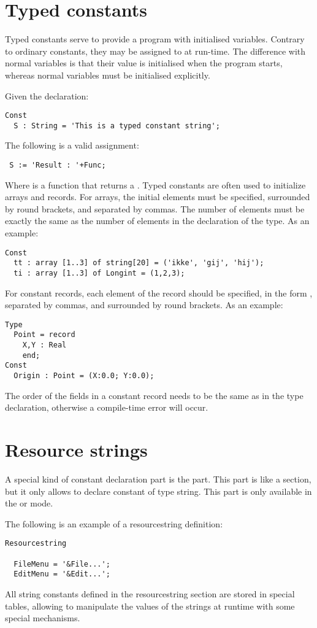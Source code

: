 \section{Typed constants}
Typed constants serve to provide a program with initialised variables.
Contrary to ordinary constants, they may be assigned to at run-time.
The difference with normal variables is that their value is initialised
when the program starts, whereas normal variables must be initialised
explicitly.

Given the declaration:
\begin{verbatim}
Const
  S : String = 'This is a typed constant string';
\end{verbatim}
The following is a valid assignment:
\begin{verbatim}
 S := 'Result : '+Func;
\end{verbatim}
Where  is a function that returns a .
Typed constants are often used to initialize arrays and records. For arrays,
the initial elements must be specified, surrounded by round brackets, and
separated by commas. The number of elements must be exactly the same as
the number of elements in the declaration of the type.
As an example:
\begin{verbatim}
Const
  tt : array [1..3] of string[20] = ('ikke', 'gij', 'hij');
  ti : array [1..3] of Longint = (1,2,3);
\end{verbatim}
For constant records, each element of the record should be specified, in
the form , separated by commas, and surrounded by round
brackets.
As an example:
\begin{verbatim}
Type
  Point = record
    X,Y : Real
    end;
Const
  Origin : Point = (X:0.0; Y:0.0);
\end{verbatim}
The order of the fields in a constant record needs to be the same as in the type declaration,
otherwise a compile-time error will occur.
\section{Resource strings}
\label{se:resourcestring}
A special kind of constant declaration part is the 
part. This part is like a  section, but it only allows
to declare constant of type string. This part is only available in the
 or  mode.

The following is an example of a resourcestring definition:
\begin{verbatim}
Resourcestring

  FileMenu = '&File...';
  EditMenu = '&Edit...';
\end{verbatim}
All string constants defined in the resourcestring section are stored
in special tables, allowing to manipulate the values of the strings
at runtime with some special mechanisms.

